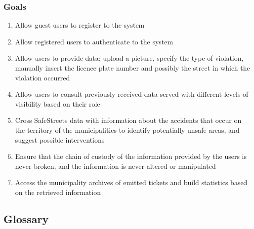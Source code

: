 \subsubsection{Goals}
	\label{sec:goals}
	\begin{enumerate}[label=\textbf{G\arabic*}]
		\item \label{goal:register} Allow guest users to register to the system
		\item \label{goal:login} Allow registered users to authenticate to the system
		\item \label{goal:provideData} Allow users to provide data: upload a picture, specify the type of violation, manually insert the licence plate number and possibly the street in which the violation occurred
		\item \label{goal:retrieveData} Allow users to consult previously received data served with different levels of visibility based on their role
		\item \label{goal:connectMunicipality} Cross SafeStreets data with information about the accidents that occur on the territory of the municipalities to identify potentially unsafe areas, and suggest possible interventions
		\item \label{goal:avoidLeaks} Ensure that the chain of custody of the information provided by the users is never broken, and the information is never altered or manipulated
		\item \label{goal:ticketsInformation} Access the municipality archives of emitted tickets and build statistics based on the retrieved information
	\end{enumerate}

\subsection{Glossary}
